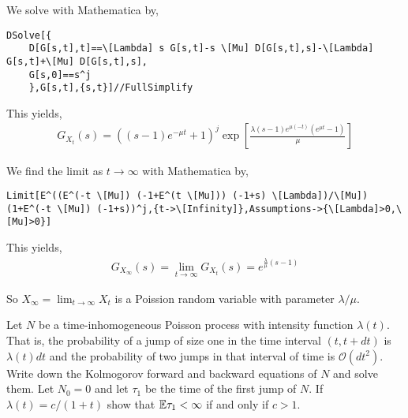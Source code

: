 \documentclass[10pt]{article}
\begin{document}
\begin{solution}[Solution]
We solve with Mathematica by,
\begin{lstlisting}
DSolve[{
    D[G[s,t],t]==\[Lambda] s G[s,t]-s \[Mu] D[G[s,t],s]-\[Lambda] G[s,t]+\[Mu] D[G[s,t],s],
    G[s,0]==s^j
    },G[s,t],{s,t}]//FullSimplify
\end{lstlisting}

This yields,
\begin{align*}
    G_{X_t}(s) = \left((s-1) e^{-\mu t}+1\right)^j \exp \left[ \frac{\lambda  (s-1) e^{\mu  (-t)} \left(e^{\mu  t}-1\right)}{\mu } \right]
\end{align*}

We find the limit as \( t\to\infty \) with Mathematica by,
\begin{lstlisting}
Limit[E^((E^(-t \[Mu]) (-1+E^(t \[Mu])) (-1+s) \[Lambda])/\[Mu]) (1+E^(-t \[Mu]) (-1+s))^j,{t->\[Infinity]},Assumptions->{\[Lambda]>0,\[Mu]>0}]
\end{lstlisting}

This yields,
\begin{align*}
    G_{X_\infty}(s) = \lim_{t\to\infty} G_{X_t}(s) = e^{\frac{\lambda}{\mu}(s-1)} 
\end{align*}

So \( X_\infty = \lim_{t\to\infty} X_t \) is a Poission random variable with parameter \( \lambda/\mu \).
\end{solution}

\begin{problem}[Exercise 5.4]
    Let \( N \) be a time-inhomogeneous Poisson process with intensity function \( \lambda(t) \). That is, the probability of a jump of size one in the time interval \( (t,t+ dt) \) is \( \lambda(t)dt \) and the probability of two jumps in that interval of time is \( \mathcal{O}(dt^2) \). Write down the Kolmogorov forward and backward equations of \( N \) and solve them. Let \( N_0 = 0 \) and let \( \tau_1 \) be the time of the first jump of \( N \). If \( \lambda(t) = c/(1 + t) \) show that \( \mathbb{E}\tau_1< \infty \) if and only if \( c >1 \).
\end{problem}
\end{document}
